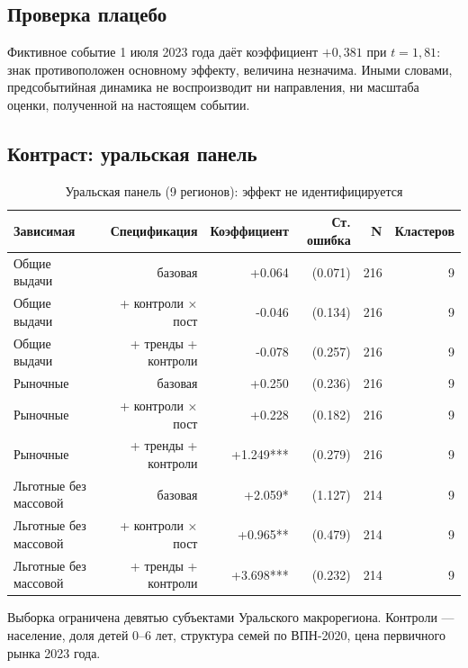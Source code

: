 \documentclass[
  russian,
  11pt,
]{article}
\begin{document}
\subsection{Проверка
плацебо}\label{ux43fux440ux43eux432ux435ux440ux43aux430-ux43fux43bux430ux446ux435ux431ux43e}

Фиктивное событие 1 июля 2023 года даёт коэффициент \(+0{,}381\) при
\(t = 1{,}81\): знак противоположен основному эффекту, величина
незначима. Иными словами, предсобытийная динамика не воспроизводит ни
направления, ни масштаба оценки, полученной на настоящем событии.

\subsection{Контраст: уральская
панель}\label{ux43aux43eux43dux442ux440ux430ux441ux442-ux443ux440ux430ux43bux44cux441ux43aux430ux44f-ux43fux430ux43dux435ux43bux44c}

\begin{table}[htbp]
\centering
\small
\caption{Уральская панель (9 регионов): эффект не идентифицируется}
\label{tab:ural}
\begin{tabular}{lrrrrr}
\toprule
Зависимая & Спецификация & Коэффициент & Ст. ошибка & N & Кластеров \\
\midrule
Общие выдачи & базовая & +0.064 & (0.071) & 216 & 9 \\
Общие выдачи & + контроли × пост & -0.046 & (0.134) & 216 & 9 \\
Общие выдачи & + тренды + контроли & -0.078 & (0.257) & 216 & 9 \\
Рыночные & базовая & +0.250 & (0.236) & 216 & 9 \\
Рыночные & + контроли × пост & +0.228 & (0.182) & 216 & 9 \\
Рыночные & + тренды + контроли & +1.249*** & (0.279) & 216 & 9 \\
Льготные без массовой & базовая & +2.059* & (1.127) & 214 & 9 \\
Льготные без массовой & + контроли × пост & +0.965** & (0.479) & 214 & 9 \\
Льготные без массовой & + тренды + контроли & +3.698*** & (0.232) & 214 & 9 \\
\bottomrule
\end{tabular}
\par\smallskip\begin{minipage}{0.92\textwidth}\footnotesize
Выборка ограничена девятью субъектами Уральского макрорегиона. Контроли — население, доля детей 0--6 лет, структура семей по ВПН-2020, цена первичного рынка 2023 года. 
\end{minipage}
\end{table}
\end{document}
